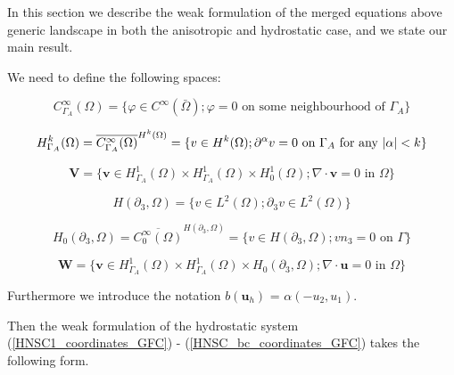 \documentclass[12pt]{report}
\numberwithin{theorem}{chapter}
\numberwithin{corollary}{chapter}
\numberwithin{lemma}{chapter}
\numberwithin{remark}{chapter}
\numberwithin{definition}{chapter}
\numberwithin{prop}{chapter}
\begin{document}
In this section we describe the weak formulation of the merged equations above generic landscape in both the anisotropic and hydrostatic case, and we state our main result.
  
We need to define the following spaces:

\[ C^{\infty}_{\Gamma_A} (\Omega) = \{ \varphi \in C^\infty (\bar{\Omega}); \varphi = 0 \text{ on some neighbourhood of } \Gamma_A \} \]

\[ H^k_{\Gamma_A} (\Omega) = \overline{C_{\Gamma_A} ^ \infty (\Omega)} ^ {H^k (\Omega)} = \{ v \in H^k(\Omega); \partial^\alpha v=0 \text{ on } \Gamma_A \text{ for any } \abs{\alpha} < k \} \]

\[ \mathbf{V} = \{ \mathbf{v} \in  H^1_{\Gamma_A} (\Omega) \times H^1_{\Gamma_A} (\Omega) \times H^1_0 (\Omega); \nabla \cdot \mathbf{v} = 0 \text{ in } \Omega \} \]

\[ H (\partial_3, \Omega) = \{ v \in L^2(\Omega); \partial_3 v \in L^2 (\Omega)\} \]

\[ H_0 (\partial_3, \Omega) = \overline{C_0 ^\infty (\Omega)}^{H (\partial_3, \Omega)} = \{ v \in H(\partial_3, \Omega); v n_3 = 0 \text{ on } \Gamma \} \]

\[ \mathbf{W} = \{ \mathbf{v} \in  H^1_{\Gamma_A} (\Omega) \times H^1_{\Gamma_A} (\Omega) \times H_0 (\partial_3, \Omega); \nabla \cdot \mathbf{u} = 0 \text{ in } \Omega \} \]

Furthermore we introduce the notation $b(\mathbf{u}_h)$ = $\alpha (-u_2 , u_1).$

Then the weak formulation of the hydrostatic system (\ref{HNSC1_coordinates_GFC}) - (\ref{HNSC_bc_coordinates_GFC}) takes the following form.
  
\end{document}
